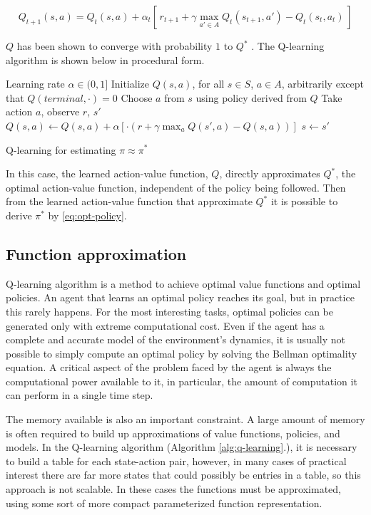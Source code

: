 \documentclass{article}
\begin{document}
\begin{equation}
	Q_{t+1}(s, a) = Q_t(s, a) + \alpha_t [\, r_{t+1} + \gamma \max_{a' \in A} Q_t(s_{t+1}, a') - Q_t(s_t, a_t)\,]
\end{equation}

$Q$ has been shown to converge with probability $1$ to $Q^*$ \cite{10.5555/3312046}. The Q-learning algorithm is shown below in procedural form.

\begin{algorithm}[H]
	\begin{algorithmic}
		\Require
		\Statex Learning rate $\alpha \in (0, 1]$
		\State Initialize $Q(s,a)$, for all $s \in S$, $a \in A$, arbitrarily except that $Q(terminal, \cdot ) = 0$
		\State Choose $a$ from $s$ using policy derived from $Q$
		\State Take action $a$, observe $r$, $s'$
		\State $Q(s, a) \gets Q(s, a) + \alpha [\cdot (r + \gamma  \max_{a} Q(s', a) - Q(s,a))]$
		\State $s \gets s'$
		\EndWhile
		\EndProcedure
	\end{algorithmic}
	\caption{Q-learning for estimating $\pi \approx \pi^*$}
	\label{alg:q-learning}
\end{algorithm}

In this case, the learned action-value function, $Q$, directly approximates $Q^*$, the optimal action-value function, independent of the policy being followed. Then from the learned action-value function that approximate $Q^*$ it is possible to derive $\pi^*$ by \autoref{eq:opt-policy}.

\subsection{Function approximation}
Q-learning algorithm is a method to achieve optimal value functions and optimal policies. An agent that learns an optimal policy reaches its goal, but in practice this rarely happens. For the most interesting tasks, optimal policies can be generated only with extreme computational cost. Even if the agent has a complete and accurate model of the environment's dynamics, it is usually not possible to simply compute an optimal policy by solving the Bellman optimality equation. A critical aspect of the problem faced by the agent is always the computational power available to it, in particular, the amount of computation it can perform in a single time step.

The memory available is also an important constraint. A large amount of memory is often required to build up approximations of value functions, policies, and models. In the Q-learning algorithm (Algorithm \ref{alg:q-learning}.), it is necessary to build a table for each state-action pair, however, in many cases of practical interest there are far more states that could possibly be entries in a table, so this approach is not scalable. In these cases the functions must be approximated, using some sort of more compact parameterized function representation.
\end{document}
